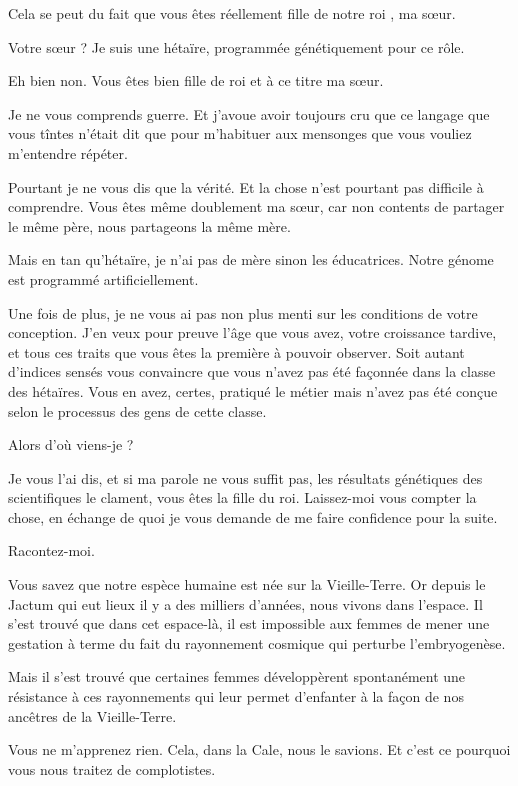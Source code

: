 \begin{drama}
   \elenaspeaks Cela se peut du fait que vous êtes réellement fille de notre roi \roi, ma sœur.

   \elaspeaks Votre sœur ? Je suis une hétaïre, programmée génétiquement pour ce rôle.

   \elenaspeaks Eh bien non. Vous êtes bien fille de roi et à ce titre ma sœur.

   \elaspeaks Je ne vous comprends guerre. Et j’avoue avoir toujours cru que ce langage que vous tîntes n’était dit que pour m’habituer aux mensonges que vous vouliez m’entendre répéter.


   \elenaspeaks Pourtant je ne vous dis que la vérité. Et la chose n’est pourtant pas difficile à comprendre. Vous êtes même doublement ma sœur, car non contents de partager le même père, nous partageons la même mère.

   \elaspeaks Mais en tan qu’hétaïre, je n’ai pas de mère sinon les éducatrices. Notre génome est programmé artificiellement.

   \elenaspeaks Une fois de plus, je ne vous ai pas non plus menti sur les conditions de votre conception. J’en veux pour preuve l’âge que vous avez, votre croissance tardive, et tous ces traits que vous êtes la première à pouvoir observer. Soit autant d’indices sensés vous convaincre que vous n’avez pas été façonnée dans la classe des hétaïres. Vous en avez, certes, pratiqué le métier mais n’avez pas été conçue selon le processus des gens de cette classe.

   \elaspeaks Alors d’où viens-je ?

   \elenaspeaks Je vous l’ai dis, et si ma parole ne vous suffit pas, les résultats génétiques des scientifiques le clament, vous êtes la fille du roi. Laissez-moi vous compter la chose, en échange de quoi je vous demande de me faire confidence pour la suite.

   \elaspeaks Racontez-moi.

   \elenaspeaks Vous savez que notre espèce humaine est née sur la Vieille-Terre. Or depuis le Jactum qui eut lieux il y a des milliers d’années, nous vivons dans l’espace. Il s’est trouvé que dans cet espace-là, il est impossible aux femmes de mener une gestation à terme du fait du rayonnement cosmique qui perturbe l’embryogenèse.

   Mais il s’est trouvé que certaines femmes développèrent spontanément une résistance à ces rayonnements qui leur permet d’enfanter à la façon de nos ancêtres de la Vieille-Terre.

   \elaspeaks Vous ne m’apprenez rien. Cela, dans la Cale, nous le savions. Et c’est ce pourquoi vous nous traitez de complotistes.


\end{drama}
